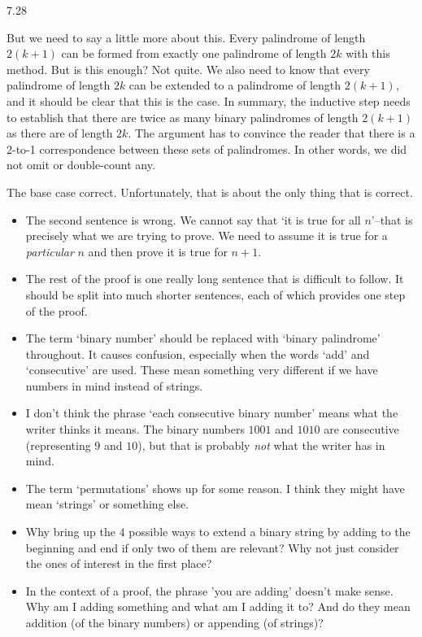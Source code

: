 \begin{Answer}{7.28}
\begin{pfevalenum}
\begin{itemize}
	But we need to say a little more about this.  Every palindrome of length
	$2(k+1)$ can be formed from exactly one palindrome of length $2k$ with this method.  But is this enough?
	Not quite.  We also need to know that every palindrome of length $2k$ can be extended to a palindrome of
	length $2(k+1)$, and it should be clear that this is the case.
	In summary, the inductive step needs to establish that there are twice as many binary palindromes of length $2(k+1)$ as there are of length $2k$.
	The argument has to convince the reader that there is a 2-to-1 correspondence between these sets of palindromes.  In other words, we did not omit or double-count any.
	\end{itemize}
\item
	The base case correct.  Unfortunately, that is about the only thing that is correct.
	\begin{itemize}
	\item
	The second sentence is wrong.
	We cannot say that `it is true for all $n$'--that is precisely what we are trying to prove.  We need
	to assume it is true for a {\em particular} $n$ and then prove it is true for $n+1$.
	\item
	The rest of the proof is one really long sentence that is difficult to follow.  It should be split
	into much shorter sentences, each of which provides one step of the proof.	
	\item
	The term `binary number' should be replaced with `binary palindrome' throughout.  It causes
	confusion, especially when the words `add' and `consecutive' are used.  These mean something
	very different if we have numbers in mind instead of strings.
	\item
	I don't think the phrase `each consecutive binary number' means what the writer thinks it means.
	The binary numbers $1001$ and $1010$ are consecutive (representing $9$ and $10$), but that is
	probably {\em not}	what the writer has in mind.
	\item
	The term `permutations' shows up for some reason.
	I think they might have mean `strings' or something else.
	\item
	Why bring up the $4$ possible ways to extend a binary
	string by adding to the beginning and end if only two of them are relevant?
	Why not just consider the ones of interest in the first place?
	\item
	In the context of a proof, the phrase 'you are adding' doesn't make sense.  Why am I adding something
	and what am I adding it to?  And do they mean addition (of the binary numbers) or appending (of strings)?

\end{itemize}
\end{pfevalenum}
\end{Answer}

